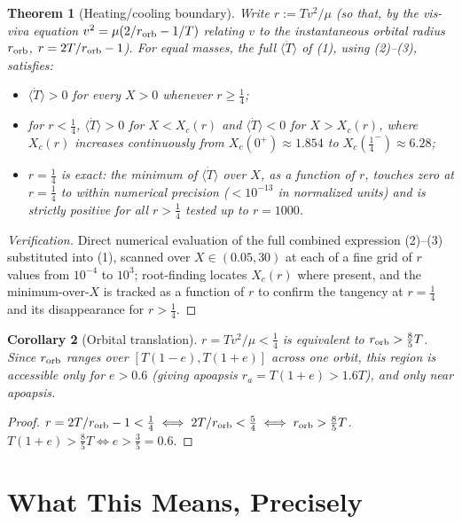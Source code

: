 \documentclass[12pt]{amsart}
\theoremstyle{plain}
\newtheorem{theorem}{Theorem}[section]
\newtheorem{corollary}[theorem]{Corollary}
\theoremstyle{remark}
\begin{document}
\begin{theorem}[Heating/cooling boundary]\label{thm:boundary}
Write $r:=Tv^2/\mu$ (so that, by the vis-viva equation $v^2=\mu(2/r_{\rm orb}-1/T)$ relating $v$ to the instantaneous orbital radius $r_{\rm orb}$, $r=2T/r_{\rm orb}-1$). For equal masses, the full $\langle\dot T\rangle$ of (1), using (2)--(3), satisfies:
\begin{itemize}
\item[(a)] $\langle\dot T\rangle>0$ for every $X>0$ whenever $r\geq\tfrac14$;
\item[(b)] for $r<\tfrac14$, $\langle\dot T\rangle>0$ for $X<X_c(r)$ and $\langle\dot T\rangle<0$ for $X>X_c(r)$, where $X_c(r)$ increases continuously from $X_c(0^+)\approx1.854$ to $X_c(\tfrac14^-)\approx6.28$;
\item[(c)] $r=\tfrac14$ is exact: the minimum of $\langle\dot T\rangle$ over $X$, as a function of $r$, touches zero at $r=\tfrac14$ to within numerical precision ($<10^{-13}$ in normalized units) and is strictly positive for all $r>\tfrac14$ tested up to $r=1000$.
\end{itemize}
\end{theorem}

\begin{proof}[Verification]
Direct numerical evaluation of the full combined expression (2)--(3) substituted into (1), scanned over $X\in(0.05,30)$ at each of a fine grid of $r$ values from $10^{-4}$ to $10^3$; root-finding locates $X_c(r)$ where present, and the minimum-over-$X$ is tracked as a function of $r$ to confirm the tangency at $r=\tfrac14$ and its disappearance for $r>\tfrac14$.
\end{proof}

\begin{corollary}[Orbital translation]\label{cor:orbit}
$r=Tv^2/\mu<\tfrac14$ is equivalent to $r_{\rm orb}>\tfrac85T$. Since $r_{\rm orb}$ ranges over $[T(1-e),T(1+e)]$ across one orbit, this region is accessible only for $e>0.6$ (giving apoapsis $r_a=T(1+e)>1.6T$), and only near apoapsis.
\end{corollary}

\begin{proof}
$r=2T/r_{\rm orb}-1<\tfrac14 \iff 2T/r_{\rm orb}<\tfrac54 \iff r_{\rm orb}>\tfrac85T$. $T(1+e)>\tfrac85T \iff e>\tfrac35=0.6$.
\end{proof}

\section{What This Means, Precisely}
\end{document}

